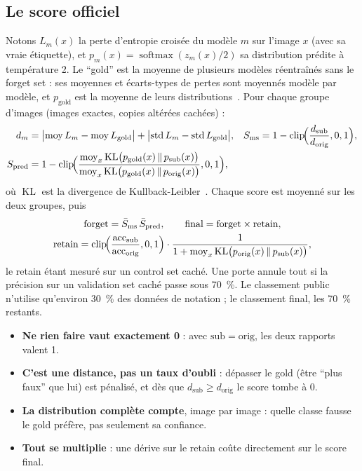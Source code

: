 \documentclass[11pt,a4paper]{article}
\newcommand{\KL}{\operatorname{KL}}
\newcommand{\clip}{\operatorname{clip}}
\newcommand{\Exp}{\operatorname*{moy}}
\newcommand{\orig}{\mathrm{orig}}
\newcommand{\gold}{\mathrm{gold}}
\newcommand{\sub}{\mathrm{sub}}
\begin{document}
\subsection{Le score officiel}\label{sec:score}
Notons $L_m(x)$ la perte d'entropie croisée du modèle $m$ sur l'image $x$ (avec sa vraie
étiquette), et $p_m(x)=\operatorname{softmax}(z_m(x)/2)$ sa distribution prédite à température
2. Le \enquote{gold} est la moyenne de plusieurs modèles réentraînés sans le forget set : ses
moyennes et écarts-types de pertes sont moyennés modèle par modèle, et $p_\gold$ est la moyenne de
leurs distributions~\cite{sujet2026}. Pour chaque groupe d'images (images exactes, copies altérées
cachées) :
\begin{align}
  d_m &= \bigl|\Exp L_m - \Exp L_\gold\bigr| + \bigl|\operatorname{std} L_m - \operatorname{std} L_\gold\bigr|,
  & S_{\text{ms}} &= 1 - \clip\!\Bigl(\frac{d_\sub}{d_\orig},0,1\Bigr), \label{eq:ms}\\
  S_{\text{pred}} &= 1 - \clip\!\Bigl(\frac{\Exp_x \KL\bigl(p_\gold(x)\,\|\,p_\sub(x)\bigr)}
  {\Exp_x \KL\bigl(p_\gold(x)\,\|\,p_\orig(x)\bigr)},0,1\Bigr), \label{eq:pred}
\end{align}
où $\KL$ est la divergence de Kullback-Leibler~\cite{kullback1951}. Chaque score est moyenné sur
les deux groupes, puis
\begin{gather}
  \text{forget} = \bar S_{\text{ms}}\,\bar S_{\text{pred}},\qquad
  \text{final} = \text{forget}\times\text{retain},\label{eq:final}\\
  \text{retain} = \clip\!\Bigl(\frac{\mathrm{acc}_\sub}{\mathrm{acc}_\orig},0,1\Bigr)\cdot
  \frac{1}{1+\Exp_x \KL\bigl(p_\orig(x)\,\|\,p_\sub(x)\bigr)},\label{eq:retain}
\end{gather}
le retain étant mesuré sur un control set caché. Une porte annule tout si la précision sur un
validation set caché passe sous \SI{70}{\percent}. Le classement public n'utilise qu'environ
\SI{30}{\percent} des données de notation ; le classement final, les \SI{70}{\percent} restants.

\begin{retenir}
\begin{itemize}[leftmargin=1.2em]
  \item \textbf{Ne rien faire vaut exactement 0} : avec $\sub=\orig$, les deux rapports valent 1.
  \item \textbf{C'est une distance, pas un taux d'oubli} : dépasser le gold (être \enquote{plus faux}
    que lui) est pénalisé, et dès que $d_\sub\ge d_\orig$ le score tombe à 0.
  \item \textbf{La distribution complète compte}, image par image : quelle classe fausse le gold
    préfère, pas seulement sa confiance.
  \item \textbf{Tout se multiplie} : une dérive sur le retain coûte directement sur le score final.
\end{itemize}
\end{retenir}
\end{document}
